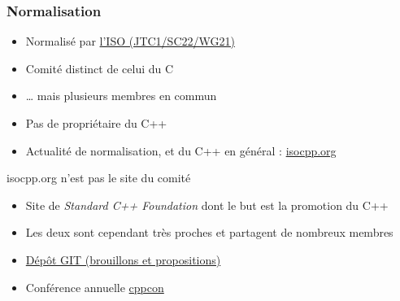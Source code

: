 \documentclass[C++.tex]{subfiles}
\begin{document}
\begin{frame}[fragile]
	\frametitle{Normalisation}
	\begin{itemize}
		\item Normalisé par \href{http://www.open-std.org/JTC1/SC22/WG21/}{l'ISO (JTC1/SC22/WG21)}
		\item Comité distinct de celui du C


		\item \ldots{} mais plusieurs membres en commun
		\item Pas de propriétaire du C++


		\item Actualité de normalisation, et du C++ en général : \href{https://isocpp.org/}{isocpp.org}

	\end{itemize}

	\begin{alertblock}{isocpp.org n'est pas le site du comité}
		\begin{itemize}
			\item Site de \textit{Standard C++ Foundation} dont le but est la promotion du C++
			\item Les deux sont cependant très proches et partagent de nombreux membres
		\end{itemize}
	\end{alertblock}

	\begin{itemize}
		\item \href{https://github.com/cplusplus}{Dépôt GIT (brouillons et propositions)}
		\item Conférence annuelle \href{http://cppcon.org/}{cppcon}
	\end{itemize}
\end{frame}
\end{document}
